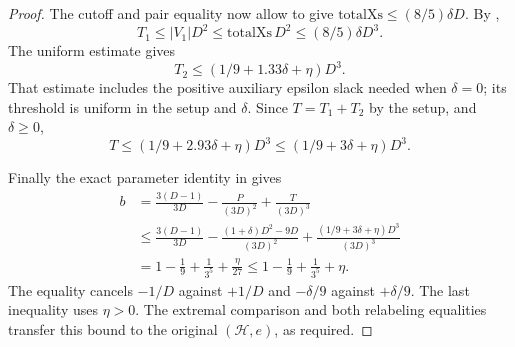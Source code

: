 \begin{proof}
The cutoff and pair equality now allow
 to give
$\mathrm{totalXs}\le(8/5)\delta D$.
By ,
\[
 T_1\le |V_1|D^2\le\mathrm{totalXs}\,D^2
       \le(8/5)\delta D^3.
\]
The uniform estimate 
gives
\[
 T_2\le(1/9+1.33\delta+\eta)D^3 .
\]
That estimate includes the positive auxiliary epsilon slack needed when
$\delta=0$; its threshold is uniform in the setup and $\delta$.
Since $T=T_1+T_2$ by the setup, and $\delta\ge0$,
\[
 T\le(1/9+2.93\delta+\eta)D^3
   \le(1/9+3\delta+\eta)D^3.
\]

Finally the exact parameter identity in
 gives
\[
\begin{aligned}
 b&=\frac{3(D-1)}{3D}-\frac{P}{(3D)^2}+\frac{T}{(3D)^3}\\
 &\le\frac{3(D-1)}{3D}
 -\frac{(1+\delta)D^2-9D}{(3D)^2}
 +\frac{(1/9+3\delta+\eta)D^3}{(3D)^3}\\
 &=1-\frac19+\frac1{3^5}+\frac{\eta}{27}
 \le1-\frac19+\frac1{3^5}+\eta.
\end{aligned}
\]
The equality cancels $-1/D$ against $+1/D$ and
$-\delta/9$ against $+\delta/9$. The last inequality uses $\eta>0$.
The extremal comparison and both relabeling equalities transfer this
bound to the original $(\mathcal H,e)$, as required.
\end{proof}
